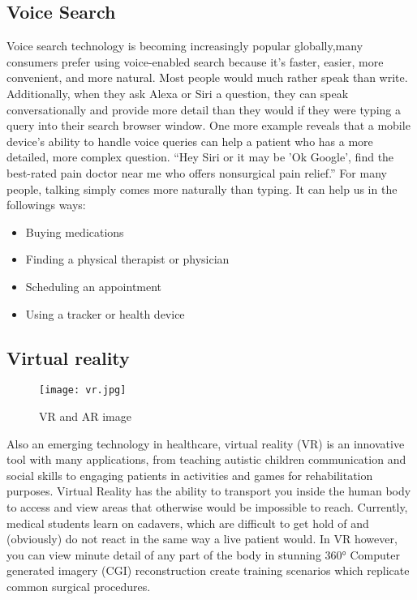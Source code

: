 \documentclass[12pts]{article}
\begin{document}
\subsection*{Voice Search}

Voice search technology is becoming increasingly popular globally,many consumers prefer using voice-enabled search because it’s faster, easier, more convenient, and more natural. Most people would much rather speak than write. Additionally, when they ask Alexa or Siri a question, they can speak conversationally and provide more detail than they would if they were typing a query into their search browser window. 
One more example reveals that a mobile device’s ability to handle voice queries can help a patient who has a more detailed, more complex question. “Hey Siri or it may be 'Ok Google', find the best-rated pain doctor near me who offers nonsurgical pain relief.” For many people, talking simply comes more naturally than typing.
It can help us in the followings ways:
\begin{itemize}
\item Buying medications
\item Finding a physical therapist or physician
\item Scheduling an appointment
\item Using a tracker or health device
\end{itemize}



\subsection*{Virtual reality}
\begin{figure}[h]
\centering
\texttt{[image: vr.jpg]}
\caption{VR and AR image}
\end{figure}

Also an emerging technology in healthcare, virtual reality (VR) is an innovative tool with many applications, from teaching autistic children communication and social skills to engaging patients in activities and games for rehabilitation purposes. 
Virtual Reality has the ability to transport you inside the human body to access and view areas that otherwise would be impossible to reach. Currently, medical students learn on cadavers, which are difficult to get hold of and (obviously) do not react in the same way a live patient would. In VR however, you can view minute detail of any part of the body in stunning 360° Computer generated imagery (CGI) reconstruction  create training scenarios which replicate common surgical procedures.
\end{document}
